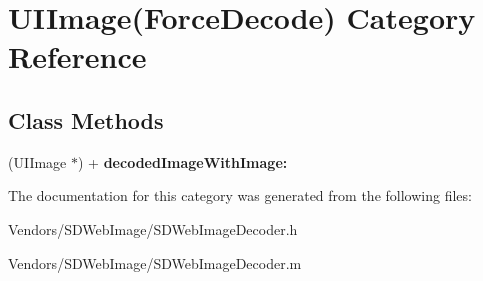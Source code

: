 \hypertarget{category_u_i_image_07_force_decode_08}{}\section{U\+I\+Image(Force\+Decode) Category Reference}
\label{category_u_i_image_07_force_decode_08}
\subsection*{Class Methods}
\begin{DoxyCompactItemize}
\item 
\hypertarget{category_u_i_image_07_force_decode_08_a292c472475a3afae92148fab133138ca}{}(U\+I\+Image $\ast$) + {\bfseries decoded\+Image\+With\+Image\+:}\label{category_u_i_image_07_force_decode_08_a292c472475a3afae92148fab133138ca}

\end{DoxyCompactItemize}


The documentation for this category was generated from the following files\+:\begin{DoxyCompactItemize}
\item 
Vendors/\+S\+D\+Web\+Image/S\+D\+Web\+Image\+Decoder.\+h\item 
Vendors/\+S\+D\+Web\+Image/S\+D\+Web\+Image\+Decoder.\+m\end{DoxyCompactItemize}
